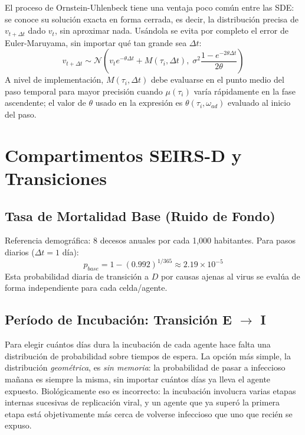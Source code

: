 \documentclass[conference]{IEEEtran}
\begin{document}
El proceso de Ornstein-Uhlenbeck tiene una ventaja poco común entre las SDE: se conoce su solución exacta en forma cerrada, es decir, la distribución precisa de $v_{t+\Delta t}$ dado $v_t$, sin aproximar nada. Usándola se evita por completo el error de Euler-Maruyama, sin importar qué tan grande sea $\Delta t$:
\begin{equation}
v_{t+\Delta t} \sim \mathcal{N}\!\left( v_t e^{-\theta \Delta t} + M(\tau_i, \Delta t),\; \sigma^2 \frac{1 - e^{-2\theta \Delta t}}{2\theta} \right)
\end{equation}
A nivel de implementación, $M(\tau_i, \Delta t)$ debe evaluarse en el punto medio del paso temporal para mayor precisión cuando $\mu(\tau_i)$ varía rápidamente en la fase ascendente; el valor de $\theta$ usado en la expresión es $\theta(\tau_i, \omega_{ad})$ evaluado al inicio del paso.

\section{Compartimentos SEIRS-D y Transiciones}
\subsection{Tasa de Mortalidad Base (Ruido de Fondo)}
Referencia demográfica: 8 decesos anuales por cada 1,000 habitantes. Para pasos diarios ($\Delta t = 1$ día):
\begin{equation}
p_{base} = 1 - (0.992)^{1/365} \approx 2.19 \times 10^{-5}
\end{equation}
Esta probabilidad diaria de transición a $D$ por causas ajenas al virus se evalúa de forma independiente para cada celda/agente.

\subsection{Período de Incubación: Transición E $\to$ I}
Para elegir cuántos días dura la incubación de cada agente hace falta una distribución de probabilidad sobre tiempos de espera. La opción más simple, la distribución \emph{geométrica}, es \emph{sin memoria}: la probabilidad de pasar a infeccioso mañana es siempre la misma, sin importar cuántos días ya lleva el agente expuesto. Biológicamente eso es incorrecto: la incubación involucra varias etapas internas sucesivas de replicación viral, y un agente que ya superó la primera etapa está objetivamente más cerca de volverse infeccioso que uno que recién se expuso.
\end{document}
